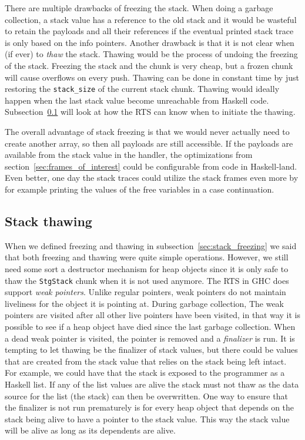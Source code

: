 There are multiple drawbacks of freezing the stack. When doing a garbage
collection, a stack value has a reference to the old stack and it would
be wasteful to retain the payloads and all their references if the
eventual printed stack trace is only based on the info pointers. Another
drawback is that it is not clear when (if ever) to \emph{thaw} the
stack. Thawing would be the process of undoing the freezing of the
stack. Freezing the stack and the chunk is very cheap, but a frozen chunk
will cause overflows on every push. Thawing can be done in
constant time by just restoring the \texttt{stack\_size} of the current
stack chunk. Thawing would ideally happen when the last stack value
become unreachable from Haskell code. Subsection~\ref{sec:stack_thawing}
will look at how the RTS can know when to initiate the thawing.

The overall advantage of stack freezing is that we would never actually
need to create another array, so then all payloads are still accessible.
If the payloads are available from the stack value in the handler,
the optimizations from section~\ref{sec:frames_of_interest} could be
configurable from code in Haskell-land. Even better, one day the stack
traces could utilize the stack frames even more by for example printing
the values of the free variables in a case continuation.

\subsection{Stack thawing} \label{sec:stack_thawing}

When we defined freezing and thawing in subsection~\ref{sec:stack_freezing} we
said that both freezing and thawing were quite simple operations. However, we still need
some sort a destructor mechanism for heap objects since it is only safe to thaw the
\texttt{StgStack} chunk when it is not used anymore.  The RTS in
GHC does support \emph{weak pointers}. Unlike regular pointers, weak pointers
do not maintain liveliness for the object it is pointing at. During garbage
collection, The weak pointers are visited after all other live pointers have
been visited, in that way it is possible to see if a heap object have died
since the last garbage collection. When a dead weak pointer is visited, the pointer is removed and a
\emph{finalizer} is run. It is tempting to let thawing be the finalizer of
stack values, but there could be values that are
created from the stack value that relies on the stack being left intact.  For
example, we could have that the stack is exposed to the programmer as a Haskell
list.  If any of the list values are alive the stack must not thaw as the data source
for the list (the stack) can then be overwritten. One way to ensure that the
finalizer is not run prematurely is for every heap object that depends on the
stack being alive to have a pointer to the stack value. This way the stack
value will be alive as long as its dependents are alive.

